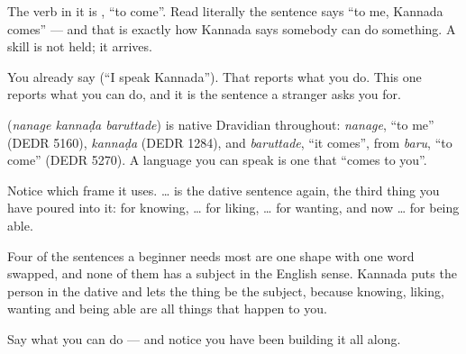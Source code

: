 The verb in it is , \textquotedblleft{}to come\textquotedblright{}. Read literally the sentence says \textquotedblleft{}to me, Kannada comes\textquotedblright{} — and that is exactly how Kannada says somebody can do something. A skill is not held; it arrives.

You already say \textbf{  } (\textquotedblleft{}I speak Kannada\textquotedblright{}). That reports what you do. This one reports what you can do, and it is the sentence a stranger asks you for.

\begin{cousinweb}
\textbf{  } (\emph{nanage kannaḍa baruttade}) is native Dravidian throughout: \emph{nanage}, \textquotedblleft{}to me\textquotedblright{} (DEDR 5160), \emph{kannaḍa} (DEDR 1284), and \emph{baruttade}, \textquotedblleft{}it comes\textquotedblright{}, from \emph{baru}, \textquotedblleft{}to come\textquotedblright{} (DEDR 5270). A language you can speak is one that \textquotedblleft{}comes to you\textquotedblright{}.
\end{cousinweb}

\begin{grammarlens}[title={Grammar Lens: the fourth thing the dative frame carries}]
Notice which frame it uses.  …  is the dative sentence again, the third thing you have poured into it:   for knowing,  …  for liking,  …  for wanting, and now  …  for being able.

Four of the sentences a beginner needs most are one shape with one word swapped, and none of them has a subject in the English sense. Kannada puts the person in the dative and lets the thing be the subject, because knowing, liking, wanting and being able are all things that happen to you.
\end{grammarlens}

\begin{grammarlens}[title={What you've built}]
Say what you can do — and notice you have been building it all along.
\end{grammarlens}

